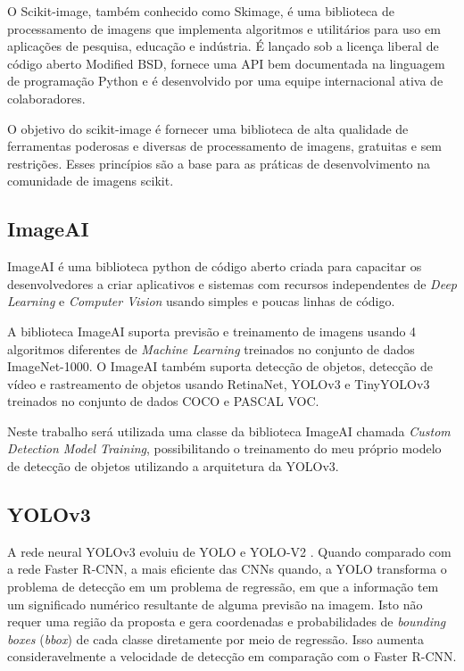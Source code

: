 O Scikit-image, também conhecido como Skimage, é uma biblioteca de processamento de imagens que implementa algoritmos e utilitários para uso em aplicações de pesquisa, educação e indústria. É lançado sob a licença liberal de código aberto Modified BSD, fornece uma API bem documentada na linguagem de programação Python e é desenvolvido por uma equipe internacional ativa de colaboradores.

O objetivo do scikit-image é fornecer uma biblioteca de alta qualidade de ferramentas poderosas e diversas de processamento de imagens, gratuitas e sem restrições. Esses princípios são a base para as práticas de desenvolvimento na comunidade de imagens scikit.\cite{skimage}

\subsection{ImageAI}

ImageAI é uma biblioteca python de código aberto criada para capacitar os desenvolvedores a criar aplicativos e sistemas com recursos independentes de \textit{Deep Learning} e \textit{Computer Vision} usando simples e poucas linhas de código.

A biblioteca ImageAI suporta previsão e treinamento de imagens usando 4 algoritmos diferentes de \textit{Machine Learning} treinados no conjunto de dados ImageNet-1000. O ImageAI também suporta detecção de objetos, detecção de vídeo e rastreamento de objetos usando RetinaNet, YOLOv3 e TinyYOLOv3 treinados no conjunto de dados COCO e PASCAL VOC.\cite{ImageAI}

Neste trabalho será utilizada uma classe da biblioteca ImageAI chamada \textit{Custom Detection Model Training}, possibilitando o treinamento do meu próprio modelo de detecção de objetos utilizando a arquitetura da YOLOv3.

\subsection{YOLOv3}

A rede neural YOLOv3 evoluiu de YOLO e YOLO-V2 \cite{redmon2018yolov3}. Quando comparado com a rede Faster R-CNN, a mais eficiente das CNNs quando, a YOLO transforma o problema de detecção em um problema de regressão, em que a informação tem um significado numérico resultante de alguma previsão na imagem. Isto não requer uma região da proposta e gera coordenadas e probabilidades de \textit{bounding boxes} (\textit{bbox}) de cada classe diretamente por meio de regressão. Isso aumenta consideravelmente a velocidade de detecção em comparação com o Faster R-CNN.\cite{yolov3_apple}

